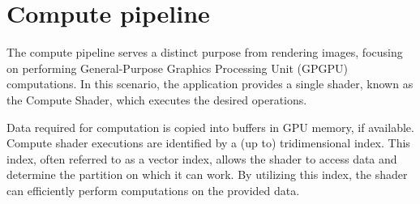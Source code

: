 \section{Compute pipeline}

The compute pipeline serves a distinct purpose from rendering images, focusing on performing General-Purpose Graphics Processing Unit (GPGPU) computations. 
In this scenario, the application provides a single shader, known as the Compute Shader, which executes the desired operations.

Data required for computation is copied into buffers in GPU memory, if available. 
Compute shader executions are identified by a (up to) tridimensional index. 
This index, often referred to as a vector index, allows the shader to access data and determine the partition on which it can work. 
By utilizing this index, the shader can efficiently perform computations on the provided data.